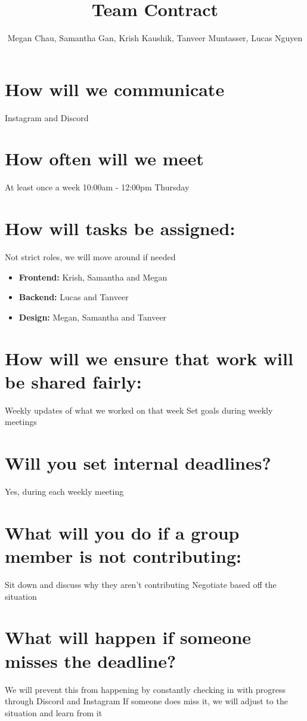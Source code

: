 \documentclass{article}
\title{Team Contract}
\author{Megan Chau, Samantha Gan, Krish Kaushik, Tanveer Muntasser, Lucas Nguyen}
\begin{document}
\setlength{\droptitle}{-1cm}
\maketitle

\section{How will we communicate}
Instagram and Discord

\section{How often will we meet}
At least once a week
10:00am - 12:00pm Thursday

\section{How will tasks be assigned:}
Not strict roles, we will move around if needed
\begin{itemize}
\item\textbf{Frontend:} Krish, Samantha and Megan
\item\textbf{Backend:} Lucas and Tanveer
\item\textbf{Design:} Megan, Samantha and Tanveer
\end{itemize}

\section{How will we ensure that work will be shared fairly:}
Weekly updates of what we worked on that week
Set goals during weekly meetings

\section{Will you set internal deadlines?}
Yes, during each weekly meeting

\section{What will you do if a group member is not contributing:}
Sit down and discuss why they aren't contributing
Negotiate based off the situation

\section{What will happen if someone misses the deadline?}
We will prevent this from happening by constantly checking in with progress through Discord and Instagram
If someone does miss it, we will adjust to the situation and learn from it
\end{document}
